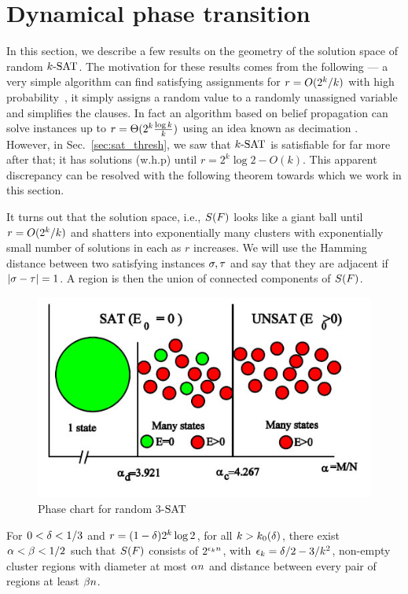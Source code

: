 \documentclass[letterpaper, 10pt, twocolumn, reqno]{amsart}
\begin{document}
\section{Dynamical phase transition}
\label{sec:dynamical_transition}

In this section, we describe a few results on the geometry of the solution space of random $\ksat$. The motivation for these results comes from the following --- a very simple algorithm can find satisfying assignments for $r = \bigo(2^k/k)$ with
high probability~\cite{chao1986probabilistic}, it simply assigns a random value to a randomly unassigned variable and simplifies the clauses. In fact an algorithm based on belief
propagation can solve instances up to $r = \bigth(2^k \f{\log k}{k})$ using an idea known as decimation \cite{montanari2007solving}. However, in Sec.~\ref{sec:sat_thresh}, we saw that $\ksat$ is satisfiable for far more after that; it has solutions (w.h.p) until $r = 2^k \log 2 - O(k)$. This apparent discrepancy can
be resolved with the following theorem towards which we work in this section.

It turns out that the solution space, i.e., $\sf$ looks like a giant ball
until $r = \bigo(2^k/k)$ and shatters into exponentially many clusters with
exponentially small number of solutions in each as $r$ increases. We will use the Hamming distance between two satisfying instances $\s,\t$ and say that they are adjacent if $\abs{\s-\t} = 1$. A region is then the union of connected components of $\sf$.

\begin{figure}[H]
\centering
\includegraphics[width=.7\columnwidth]{phase_chart}
\caption{Phase chart for random 3-$\SAT$}
\label{fig:phase_chart}
\end{figure}

\begin{theorem}
For $0 < \d < 1/3$ and $r = (1-\d) 2^k \log 2$, for all $k > k_0(\d)$, there exist $\a < \b < 1/2$ such that $\sf$ consists of $2^{\e_k n}$, with $\e_k = \d/2 - 3/k^2$, non-empty cluster regions with diameter at most $\a n$ and distance between every pair of regions at least $\b n$.
\label{thm:shatter}
\end{theorem}
\end{document}
